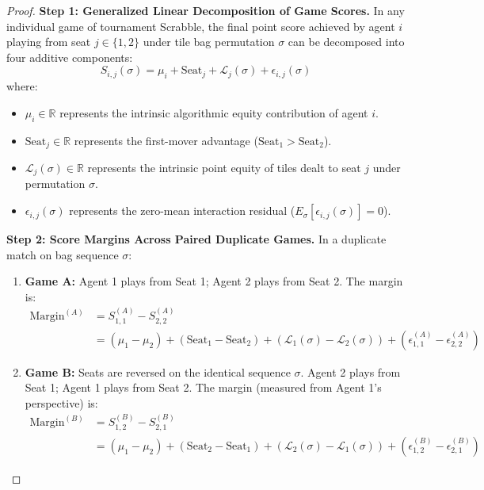 \begin{proof}
\textbf{Step 1: Generalized Linear Decomposition of Game Scores.}
In any individual game of tournament Scrabble, the final point score achieved by agent $i$ playing from seat $j \in \{1, 2\}$ under tile bag permutation $\sigma$ can be decomposed into four additive components:
\begin{equation}
    S_{i, j}(\sigma) = \mu_i + \mathrm{Seat}_j + \mathcal{L}_j(\sigma) + \epsilon_{i, j}(\sigma)
\end{equation}
where:
\begin{itemize}
    \item $\mu_i \in \mathbb{R}$ represents the intrinsic algorithmic equity contribution of agent $i$.
    \item $\mathrm{Seat}_j \in \mathbb{R}$ represents the first-mover advantage ($\mathrm{Seat}_1 > \mathrm{Seat}_2$).
    \item $\mathcal{L}_j(\sigma) \in \mathbb{R}$ represents the intrinsic point equity of tiles dealt to seat $j$ under permutation $\sigma$.
    \item $\epsilon_{i, j}(\sigma)$ represents the zero-mean interaction residual ($E_\sigma[\epsilon_{i, j}(\sigma)] = 0$).
\end{itemize}

\textbf{Step 2: Score Margins Across Paired Duplicate Games.}
In a duplicate match on bag sequence $\sigma$:
\begin{enumerate}
    \item \textbf{Game A:} Agent 1 plays from Seat 1; Agent 2 plays from Seat 2. The margin is:
    \begin{align}
        \mathrm{Margin}^{(A)} &= S_{1, 1}^{(A)} - S_{2, 2}^{(A)} \nonumber \\
        &= (\mu_1 - \mu_2) + (\mathrm{Seat}_1 - \mathrm{Seat}_2) + (\mathcal{L}_1(\sigma) - \mathcal{L}_2(\sigma)) + (\epsilon_{1, 1}^{(A)} - \epsilon_{2, 2}^{(A)})
    \end{align}
    \item \textbf{Game B:} Seats are reversed on the identical sequence $\sigma$. Agent 2 plays from Seat 1; Agent 1 plays from Seat 2. The margin (measured from Agent 1's perspective) is:
    \begin{align}
        \mathrm{Margin}^{(B)} &= S_{1, 2}^{(B)} - S_{2, 1}^{(B)} \nonumber \\
        &= (\mu_1 - \mu_2) + (\mathrm{Seat}_2 - \mathrm{Seat}_1) + (\mathcal{L}_2(\sigma) - \mathcal{L}_1(\sigma)) + (\epsilon_{1, 2}^{(B)} - \epsilon_{2, 1}^{(B)})
    \end{align}
\end{enumerate}


\end{proof}
